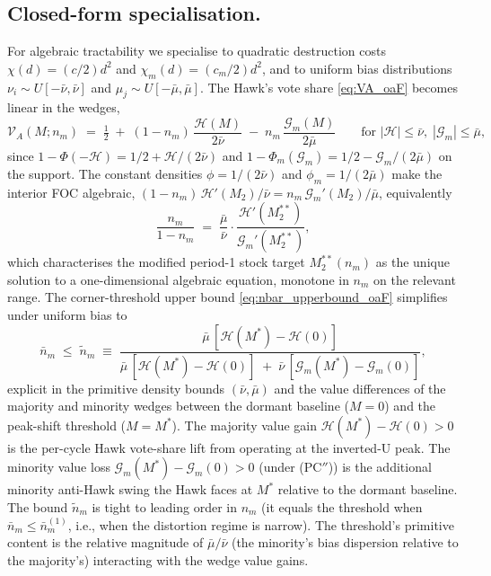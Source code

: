 \documentclass[11pt,twoside]{extarticle}
\begin{document}
\subsection*{Closed-form specialisation.} For algebraic tractability we specialise to quadratic destruction costs $\chi(d)=(c/2)d^2$ and $\chi_m(d)=(c_m/2)d^2$, and to uniform bias distributions $\nu_i\sim U[-\bar\nu,\bar\nu]$ and $\mu_j\sim U[-\bar\mu,\bar\mu]$. The Hawk's vote share \eqref{eq:VA_oaF} becomes linear in the wedges,
\begin{equation}\label{eq:VA_uniform_oaF}
    \mathcal V_A(M;n_m)\;=\;\tfrac12\;+\;(1-n_m)\,\frac{\mathcal H(M)}{2\bar\nu}\;-\;n_m\,\frac{\mathcal G_m(M)}{2\bar\mu}\qquad\text{for }|\mathcal H|\le\bar\nu,\;|\mathcal G_m|\le\bar\mu,
\end{equation}
since $1-\Phi(-\mathcal H)=1/2+\mathcal H/(2\bar\nu)$ and $1-\Phi_m(\mathcal G_m)=1/2-\mathcal G_m/(2\bar\mu)$ on the support. The constant densities $\phi=1/(2\bar\nu)$ and $\phi_m=1/(2\bar\mu)$ make the interior FOC algebraic, $(1-n_m)\,\mathcal H'(M_2)/\bar\nu=n_m\,\mathcal G_m'(M_2)/\bar\mu$, equivalently
\begin{equation}\label{eq:FOC_uniform_oaF}
    \frac{n_m}{1-n_m}\;=\;\frac{\bar\mu}{\bar\nu}\cdot\frac{\mathcal H'(M_2^{**})}{\mathcal G_m'(M_2^{**})},
\end{equation}
which characterises the modified period-1 stock target $M_2^{**}(n_m)$ as the unique solution to a one-dimensional algebraic equation, monotone in $n_m$ on the relevant range. The corner-threshold upper bound \eqref{eq:nbar_upperbound_oaF} simplifies under uniform bias to
\begin{equation}\label{eq:nbar_uniform_oaF}
    \bar n_m\;\le\;\widetilde n_m\;\equiv\;\frac{\bar\mu\,[\mathcal H(M^{*})-\mathcal H(0)]}{\bar\mu\,[\mathcal H(M^{*})-\mathcal H(0)]\;+\;\bar\nu\,[\mathcal G_m(M^{*})-\mathcal G_m(0)]},
\end{equation}
explicit in the primitive density bounds $(\bar\nu,\bar\mu)$ and the value differences of the majority and minority wedges between the dormant baseline ($M=0$) and the peak-shift threshold ($M=M^{*}$). The majority value gain $\mathcal H(M^{*})-\mathcal H(0)>0$ is the per-cycle Hawk vote-share lift from operating at the inverted-U peak. The minority value loss $\mathcal G_m(M^{*})-\mathcal G_m(0)>0$ (under (PC$''$)) is the additional minority anti-Hawk swing the Hawk faces at $M^{*}$ relative to the dormant baseline. The bound $\widetilde n_m$ is tight to leading order in $n_m$ (it equals the threshold when $\bar n_m\le\bar n_m^{(1)}$, i.e., when the distortion regime is narrow). The threshold's primitive content is the relative magnitude of $\bar\mu/\bar\nu$ (the minority's bias dispersion relative to the majority's) interacting with the wedge value gains.
\end{document}
